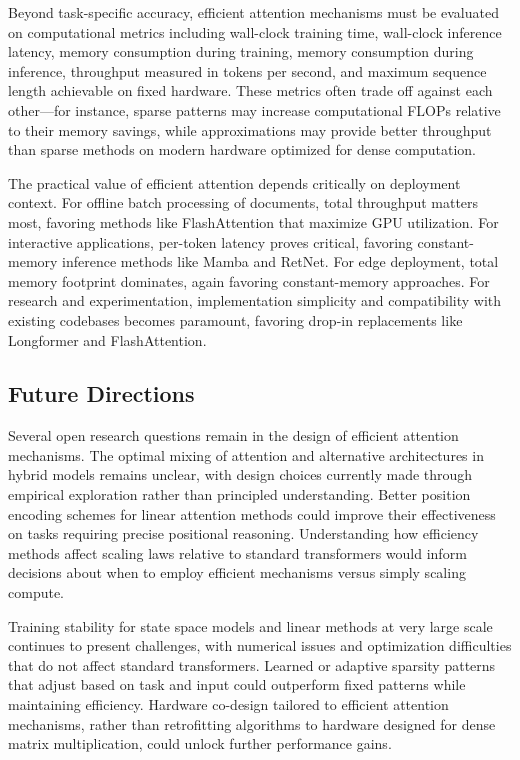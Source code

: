 Beyond task-specific accuracy, efficient attention mechanisms must be evaluated on computational metrics including wall-clock training time, wall-clock inference latency, memory consumption during training, memory consumption during inference, throughput measured in tokens per second, and maximum sequence length achievable on fixed hardware. These metrics often trade off against each other—for instance, sparse patterns may increase computational FLOPs relative to their memory savings, while approximations may provide better throughput than sparse methods on modern hardware optimized for dense computation.

The practical value of efficient attention depends critically on deployment context. For offline batch processing of documents, total throughput matters most, favoring methods like FlashAttention that maximize GPU utilization. For interactive applications, per-token latency proves critical, favoring constant-memory inference methods like Mamba and RetNet. For edge deployment, total memory footprint dominates, again favoring constant-memory approaches. For research and experimentation, implementation simplicity and compatibility with existing codebases becomes paramount, favoring drop-in replacements like Longformer and FlashAttention.

\subsection{Future Directions}

Several open research questions remain in the design of efficient attention mechanisms. The optimal mixing of attention and alternative architectures in hybrid models remains unclear, with design choices currently made through empirical exploration rather than principled understanding. Better position encoding schemes for linear attention methods could improve their effectiveness on tasks requiring precise positional reasoning. Understanding how efficiency methods affect scaling laws relative to standard transformers would inform decisions about when to employ efficient mechanisms versus simply scaling compute.

Training stability for state space models and linear methods at very large scale continues to present challenges, with numerical issues and optimization difficulties that do not affect standard transformers. Learned or adaptive sparsity patterns that adjust based on task and input could outperform fixed patterns while maintaining efficiency. Hardware co-design tailored to efficient attention mechanisms, rather than retrofitting algorithms to hardware designed for dense matrix multiplication, could unlock further performance gains.

